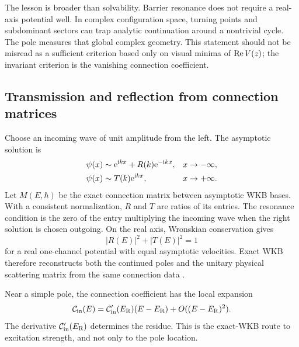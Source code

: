 The lesson is broader than solvability.  Barrier resonance does not require a
real-axis potential well.  In complex configuration space, turning points and
subdominant sectors can trap analytic continuation around a nontrivial cycle.
The pole measures that global complex geometry.  This statement should not be
misread as a sufficient criterion based only on visual minima of $\operatorname{Re} V(z)$;
the invariant criterion is the vanishing connection coefficient.

\subsection{Transmission and reflection from connection matrices}
\label{subsec:wkb-transmission}

Choose an incoming wave of unit amplitude from the left.  The asymptotic
solution is
\begin{align}
  \psi(x)&\sim
  \mathrm{e}^{\mathrm{i} kx}+R(k)\mathrm{e}^{-\mathrm{i} kx},
  &&x\to-\infty,
  \notag\\
  \psi(x)&\sim T(k)\mathrm{e}^{\mathrm{i} kx},
  &&x\to+\infty .
  \label{eq:RT-boundary}
\end{align}
Let $M(E,\hbar)$ be the exact connection matrix between asymptotic WKB bases.
With a consistent normalization, $R$ and $T$ are ratios of its entries.  The
resonance condition is the zero of the entry multiplying the incoming wave
when the right solution is chosen outgoing.  On the real axis, Wronskian
conservation gives
\begin{equation}
  |R(E)|^2+|T(E)|^2=1
  \label{eq:unitarity-RT}
\end{equation}
for a real one-channel potential with equal asymptotic velocities.  Exact WKB
therefore reconstructs both the continued poles and the unitary physical
scattering matrix from the same connection data
\cite{Morikawa:2025vvs}.

Near a simple pole, the connection coefficient has the local expansion
\begin{equation}
  \mathcal{C}_{\mathrm{in}}(E)
  =\mathcal{C}_{\mathrm{in}}'(E_{\mathrm{R}})
  (E-E_{\mathrm{R}})+O((E-E_{\mathrm{R}})^2) .
  \label{eq:connection-local-pole}
\end{equation}
The derivative $\mathcal{C}_{\mathrm{in}}'(E_{\mathrm{R}})$ determines the residue.  This
is the exact-WKB route to excitation strength, and not only to the pole
location.


